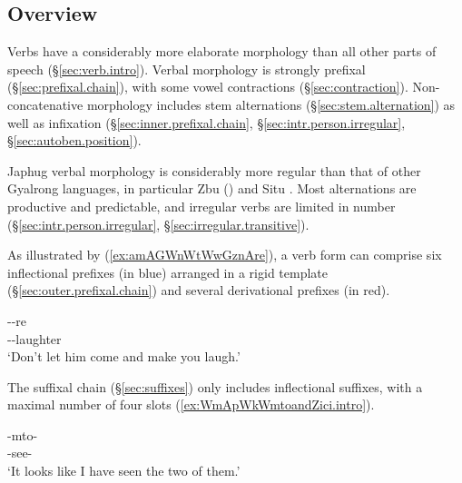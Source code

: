 \subsection{Overview} \label{sec:verb.overview.intro}
Verbs have a considerably more elaborate morphology than all other parts of speech (§\ref{sec:verb.intro}). Verbal morphology is strongly prefixal (§\ref{sec:prefixal.chain}), with some vowel contractions (§\ref{sec:contraction}). Non-concatenative morphology includes stem alternations (§\ref{sec:stem.alternation}) as well as infixation (§\ref{sec:inner.prefixal.chain}, §\ref{sec:intr.person.irregular}, §\ref{sec:autoben.position}). 

Japhug verbal morphology is considerably more regular than that of other Gyalrong languages, in particular Zbu (\citealt{jackson04showu, gong18these}) and Situ \citep{zhangsy18stem}. Most alternations are productive and predictable, and irregular verbs are limited in number (§\ref{sec:intr.person.irregular}, §\ref{sec:irregular.transitive}).

 As illustrated by (\ref{ex:amAGWnWtWwGznAre}), a verb form can comprise six inflectional prefixes (in blue) arranged in a rigid template (§\ref{sec:outer.prefixal.chain}) and several derivational prefixes (in red).
 
\begin{exe}
\ex \label{ex:amAGWnWtWwGznAre}
\gll   {}--re \\
--laughter \\
\glt `Don't let him come and make you laugh.'
\end{exe}
 
The suffixal chain (§\ref{sec:suffixes}) only includes inflectional suffixes, with a maximal number of four slots (\ref{ex:WmApWkWmtoandZici.intro}).  

 \begin{exe}
\ex \label{ex:WmApWkWmtoandZici.intro}
\gll  {}-mto- \\
 -see- \\
 \glt `It looks like I have seen the two of them.'  
\end{exe} 
 
